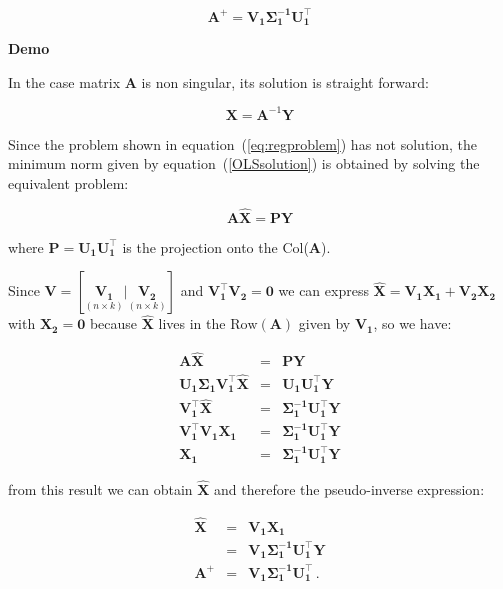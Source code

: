 \begin{equation}
\label{eq:pseudoinversesvd}
\mathbf{A}^+ = \mathbf{V_1\Sigma_1^{-1}U_1^\top}
\end{equation}

\textbf{Demo}\quad

In the case matrix $\mathbf{A}$ is non singular, its solution is
straight forward:

\begin{equation}
\label{OLSsolution}
    \mathbf{\mathbf{X}}=\mathbf{A}^{-1}\mathbf{Y}
\end{equation}


Since the problem shown in equation~(\ref{eq:regproblem}) has not
solution, the minimum norm given by equation~(\ref{OLSsolution}) is
obtained by solving the equivalent problem:

\begin{equation*}
\label{eq:proyectorsol}
\mathbf{A \hat{\mathbf{X}} = PY} 
\end{equation*}


\noindent where $\mathbf{P=U_1 U_1^\top}$ is the projection onto the
Col($\mathbf{A}$). 

Since $\mathbf{V} = [\underset{(n \times k)}{\mathbf{V_1}} |
\underset{(n \times k)}{\mathbf{V_2}}]$ and $\mathbf{V_1^\top V_2 =
0}$ we can express $\mathbf{\hat{\mathbf{X}}} = \mathbf{V_1 \mathbf{X}_1 + V_2 \mathbf{X}_2}$
with $\mathbf{\mathbf{X}_2=0}$ because $\mathbf{\hat{\mathbf{X}}}$ lives in the
$\text{Row}(\mathbf{A})$ given by $\mathbf{V_1}$, so we have:

\begin{eqnarray*}
\mathbf{A \hat{\mathbf{X}}} &=& \mathbf{PY} \\
\mathbf{U_1 \Sigma_1 V_1^\top \hat{\mathbf{X}}} &=& \mathbf{U_1 U_1^\top Y} \\
\mathbf{ V_1^\top \hat{\mathbf{X}}} &=&  \mathbf{\Sigma_1^{-1} U_1^\top Y} \\ 
\mathbf{ V_1^\top V_1 \mathbf{X}_1} &=& \mathbf{\Sigma_1^{-1}
U_1^\top Y} \\
\mathbf{\mathbf{X}_1}&=& \mathbf{\Sigma_1^{-1} U_1^\top Y}
\end{eqnarray*}

\noindent from this result we can obtain $\mathbf{\hat{\mathbf{X}}}$ and
therefore the pseudo-inverse expression:

\begin{eqnarray*}
\mathbf{\hat{\mathbf{X}}} &=& \mathbf{V_1 \mathbf{X}_1} \\
                &=& \mathbf{V_1 \Sigma_1^{-1} U_1^\top Y} \\
\mathbf{A^+} &=& \mathbf{V_1 \Sigma_1^{-1} U_1^\top} \, .
\end{eqnarray*}


